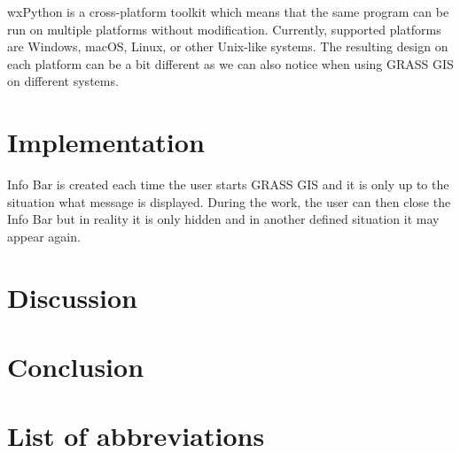 \documentclass[a4paper,10pt,twoside]{article}
\begin{document}
wxPython is a cross-platform toolkit which means that the same program can be run on multiple platforms without modification. Currently, supported platforms are Windows, macOS, Linux, or other Unix-like systems. The resulting design on each platform can be a bit different as we can also notice when using GRASS GIS on different systems.

\newpage
\vspace*{-1cm}
\section{Implementation}
\noindent
\large

Info Bar is created each time the user starts GRASS GIS and it is only up to the situation what message is displayed.  During the work, the user can then close the Info Bar but in reality it is only hidden and in another defined situation it may appear again.


\newpage
\vspace*{-1cm}
\section*{Discussion}
\noindent
\large

\newpage
\vspace*{-1cm}
\section*{Conclusion}
\noindent
\large

\newpage
\vspace*{-1cm}
\section*{List of abbreviations}
\noindent
\large
\end{document}
